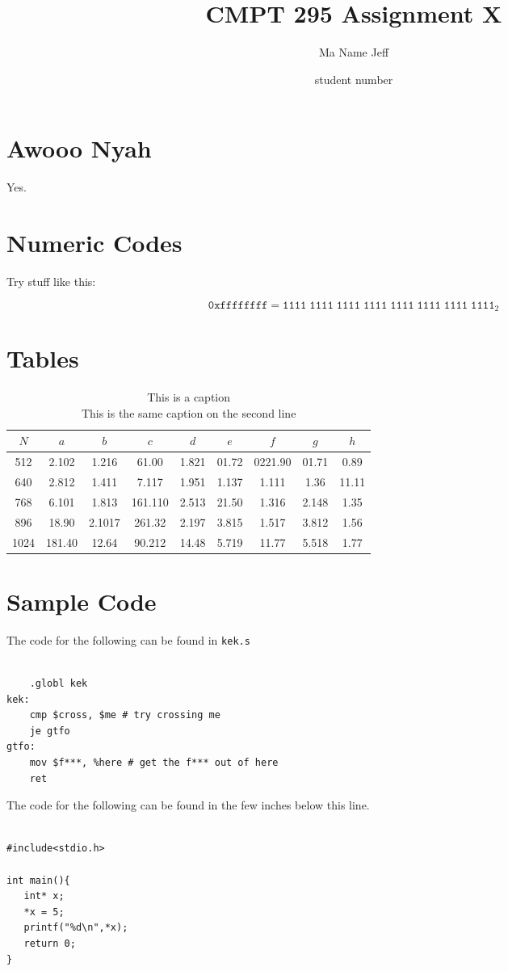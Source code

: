 \documentclass{article}
\title{CMPT 295 Assignment X}
\author{Ma Name Jeff}
\date{student number}
\begin{document}
\maketitle

\section{Awooo Nyah}
Yes.

\section{Numeric Codes}

Try stuff like this:

$$
\mathtt{0xffffffff} = \mathtt{1111\;1111\;1111\;1111\;1111\;1111\;1111\;1111}_2
$$

\section{Tables}
\begin{table}[h]
   \centering
   \begin{tabular}{|c||cc|cc|cc|cc|}
       \hline
       $N$ & $a$ & $b$& $c$ & $d$&$e$ & $f$&$g$ & $h$\\
       \hline
       512 &2.102&1.216&61.00&1.821&01.72&0221.90&01.71&0.89\\
       640 &2.812&1.411&7.117&1.951&1.137&1.111&1.36&11.11\\
       768 &6.101&1.813&161.110&2.513&21.50&1.316&2.148&1.35\\
       896 &18.90&2.1017&261.32&2.197&3.815&1.517&3.812&1.56\\
       1024 &181.40&12.64&90.212&14.48&5.719&11.77&5.518&1.77\\
       \hline
   \end{tabular}
   \caption{This is a caption\\This is the same caption on the second line}
\end{table}

\section{Sample Code}
The code for the following can be found in \texttt{kek.s}
\begin{lstlisting}

	.globl kek
kek:
	cmp $cross, $me # try crossing me
	je gtfo
gtfo:
	mov $f***, %here # get the f*** out of here
	ret

\end{lstlisting}
The code for the following can be found in the few inches below this line.
\begin{lstlisting}[style=CStyle]

#include<stdio.h>

int main(){
   int* x;
   *x = 5;
   printf("%d\n",*x);
   return 0;
}
   
\end{lstlisting}
\newpage
\end{document}
